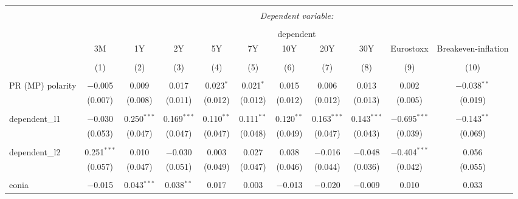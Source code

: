 

\begin{table}[!htbp] \centering 
  \caption{} 
  \label{} 
\begin{adjustbox}{width=1.35\textwidth}
\begin{tabular}{@{\extracolsep{5pt}}lcccccccccc} 
\\[-1.8ex]\hline 
\hline \\[-1.8ex] 
 & \multicolumn{10}{c}{\textit{Dependent variable:}} \\ 
\cline{2-11} 
\\[-1.8ex] & \multicolumn{10}{c}{dependent} \\ 
 & 3M & 1Y & 2Y & 5Y & 7Y & 10Y & 20Y & 30Y & Eurostoxx & Breakeven-inflation \\ 
\\[-1.8ex] & (1) & (2) & (3) & (4) & (5) & (6) & (7) & (8) & (9) & (10)\\ 
\hline \\[-1.8ex] 
 PR (MP) polarity & $-$0.005 & 0.009 & 0.017 & 0.023$^{*}$ & 0.021$^{*}$ & 0.015 & 0.006 & 0.013 & 0.002 & $-$0.038$^{**}$ \\ 
  & (0.007) & (0.008) & (0.011) & (0.012) & (0.012) & (0.012) & (0.012) & (0.013) & (0.005) & (0.019) \\ 
  & & & & & & & & & & \\ 
 dependent\_l1 & $-$0.030 & 0.250$^{***}$ & 0.169$^{***}$ & 0.110$^{**}$ & 0.111$^{**}$ & 0.120$^{**}$ & 0.163$^{***}$ & 0.143$^{***}$ & $-$0.695$^{***}$ & $-$0.143$^{**}$ \\ 
  & (0.053) & (0.047) & (0.047) & (0.047) & (0.048) & (0.049) & (0.047) & (0.043) & (0.039) & (0.069) \\ 
  & & & & & & & & & & \\ 
 dependent\_l2 & 0.251$^{***}$ & 0.010 & $-$0.030 & 0.003 & 0.027 & 0.038 & $-$0.016 & $-$0.048 & $-$0.404$^{***}$ & 0.056 \\ 
  & (0.057) & (0.047) & (0.051) & (0.049) & (0.047) & (0.046) & (0.044) & (0.036) & (0.042) & (0.055) \\ 
  & & & & & & & & & & \\ 
 eonia & $-$0.015 & 0.043$^{***}$ & 0.038$^{**}$ & 0.017 & 0.003 & $-$0.013 & $-$0.020 & $-$0.009 & 0.010 & 0.033 \\ 

\end{tabular}
\end{adjustbox}
\end{table}

